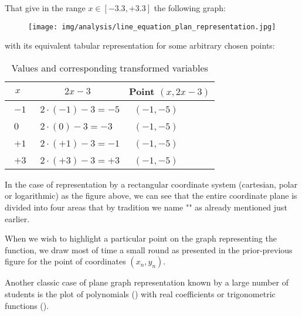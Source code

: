 That give in the range $x\in [-3.3,+3.3]$ the following graph:
\begin{figure}[H]
	\centering
	\texttt{[image: img/analysis/line\_equation\_plan\_representation.jpg]}
\end{figure}
with its equivalent tabular representation for some arbitrary chosen points:
\begin{table}[H]
	\begin{center}
			\begin{tabular}{|p{2cm}|p{3.5cm}|p{2.5cm}|}
				\hline
				\multicolumn{1}{c}{\cellcolor{black!30}\textbf{$x$}} & 
  \multicolumn{1}{c}{\cellcolor{black!30}\textbf{$2x-3$}} &  \multicolumn{1}{c}{\cellcolor{black!30}\textbf{Point $(x,2x-3)$}}\\ \hline
				\centering\arraybackslash\ $-1$ & \centering\arraybackslash\ $2\cdot(-1)-3=-5$ & \centering\arraybackslash\ $(-1,-5)$ \\ \hline
				\centering\arraybackslash\ $0$ & \centering\arraybackslash\ $2\cdot (0)-3=-3$ & \centering\arraybackslash\ $(-1,-5)$  \\ \hline
				\centering\arraybackslash\ $+1$ & \centering\arraybackslash\ $2\cdot(+1)-3=-1$ & \centering\arraybackslash\ $(-1,-5)$  \\ \hline
				\centering\arraybackslash\ $+3$ & \centering\arraybackslash\ $2\cdot(+3)-3=+3$ & \centering\arraybackslash\ $(-1,-5)$  \\ \hline
		\end{tabular}
	\end{center}
	\caption[]{Values and corresponding transformed variables}
	\end{table}	
In the case of representation by a rectangular coordinate system (cartesian, polar or logarithmic) as the figure above, we can see that the entire coordinate plane is divided into four areas that by tradition we name "" as already mentioned just earlier.

	\begin{tcolorbox}[title=Remark,colframe=black,arc=10pt]
	When we wish to highlight a particular point on the graph representing the function, we draw most of time a small round as presented in the prior-previous figure for the point of coordinates $(x_n,y_n)$.
	\end{tcolorbox}	

Another classic case of plane graph representation  known by a large number of students is the plot of polynomials () with real coefficients or trigonometric functions ().


